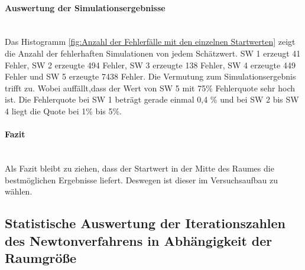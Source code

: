 \paragraph{Auswertung der Simulationsergebnisse}\ \\
Das Histogramm \ref{fig:Anzahl der Fehlerfälle mit den einzelnen Startwerten} zeigt die Anzahl der fehlerhaften Simulationen von jedem Schätzwert. SW 1 erzeugt 41 Fehler, SW 2 erzeugte 494 Fehler, SW 3 erzeugte 138 Fehler, SW 4 erzeugte 449 Fehler und SW 5 erzeugte 7438 Fehler.
Die Vermutung zum Simulationsergebnis trifft zu. Wobei auffällt,dass der Wert von SW 5 mit 75\% Fehlerquote sehr hoch ist.
Die Fehlerquote bei SW 1 beträgt gerade einmal 0,4 \%  und bei SW 2 bis SW 4 liegt die Quote bei 1\% bis 5\%.
 
\paragraph{Fazit}\ \\
Als Fazit bleibt zu ziehen, dass der Startwert in der Mitte des Raumes die bestmöglichen Ergebnisse liefert. Deswegen ist dieser im Versuchsaufbau zu wählen.


\subsection{Statistische Auswertung der Iterationszahlen des Newtonverfahrens in Abhängigkeit der Raumgröße}
